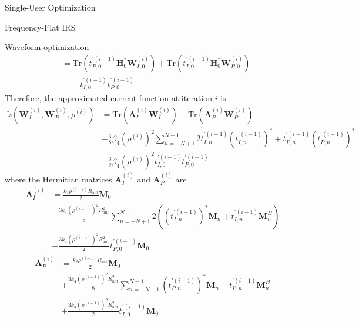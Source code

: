 \documentclass{IEEEtran}
\begin{document}
\begin{section}{Single-User Optimization}
\begin{subsection}{Frequency-Flat IRS}
\begin{subsubsection}{Waveform optimization}
\begin{equation}
\begin{split}
					& = \mathrm{Tr}(t_{P,0}^{\prime (i-1)}\boldsymbol{H}_{0}^*\boldsymbol{W}_{I,0}^{(i)}) + \mathrm{Tr}(t_{I,0}^{\prime (i-1)}\boldsymbol{H}_{0}^*\boldsymbol{W}_{P,0}^{(i)})\\
					& \quad - t_{I,0}^{\prime (i-1)} t_{P,0}^{\prime (i-1)}
				\end{split}
			\end{equation}
			Therefore, the approximated current function at iteration $i$ is
			\begin{equation}\label{eq:z_waveform_approx}
				\begin{split}
					\tilde{z}(\boldsymbol{W}_I^{(i)},\boldsymbol{W}_P^{(i)},\rho^{(i)})
					& = \mathrm{Tr}(\boldsymbol{A}_I^{(i)}\boldsymbol{W}_I^{(i)}) + \mathrm{Tr}(\boldsymbol{A}_P^{(i)}\boldsymbol{W}_P^{(i)})\\
					& - \frac{3}{8} \beta_4 (\rho^{(i)})^2 \sum_{n=-N+1}^{N-1} 2t_{I,n}^{\prime (i-1)} (t_{I,n}^{\prime (i-1)})^* + t_{P,n}^{\prime (i-1)} (t_{P,n}^{\prime (i-1)})^* \\
					& - \frac{3}{2} \beta_4 (\rho^{(i)})^2 t_{I,0}^{\prime (i-1)} t_{P,0}^{\prime (i-1)}
				\end{split}
			\end{equation}
			where the Hermitian matrices $\boldsymbol{A}_I^{(i)}$ and $\boldsymbol{A}_P^{(i)}$ are
			\begin{equation}\label{eq:A_I}
				\begin{split}
					\boldsymbol{A}_I^{(i)}
					& = \frac{k_2 \rho^{(i-1)} R_{\text{ant}}}{2}\boldsymbol{M}_0 \\
					& + \frac{3 k_4 (\rho^{(i-1)})^2 R_{\text{ant}}^2}{8} \sum_{n=-N+1}^{N-1} 2\left((t_{I,n}^{\prime (i-1)})^*\boldsymbol{M}_{n} + t_{I,n}^{\prime (i-1)}\boldsymbol{M}_{n}^H\right) \\
					& + \frac{3{k_4}{(\rho^{(i-1)})^2}{R_{\text{ant}}^2}}{2} t_{P,0}^{\prime (i-1)}\boldsymbol{M}_{0}
				\end{split}
			\end{equation}
			\begin{equation}\label{eq:A_P}
				\begin{split}
					\boldsymbol{A}_P^{(i)}
					& = \frac{k_2 \rho^{(i-1)} R_{\text{ant}}}{2}\boldsymbol{M}_0 \\
					& + \frac{3 k_4 (\rho^{(i-1)})^2 R_{\text{ant}}^2}{8} \sum_{n=-N+1}^{N-1} (t_{P,n}^{\prime (i-1)})^*\boldsymbol{M}_{n} + t_{P,n}^{\prime (i-1)}\boldsymbol{M}_{n}^H \\
					& + \frac{3{k_4}{(\rho^{(i-1)})^2}{R_{\text{ant}}^2}}{2} t_{I,0}^{\prime (i-1)}\boldsymbol{M}_{0}

\end{split}
\end{equation}
\end{subsubsection}
\end{subsection}
\end{section}
\end{document}
